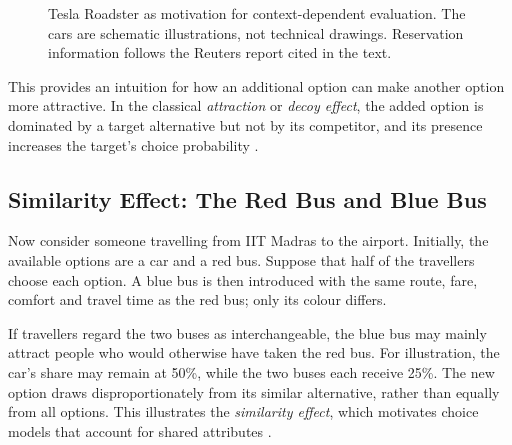 \documentclass[12pt,oneside]{report}
\begin{document}
\begin{figure}[H]
\begin{minipage}{\textwidth}
    \par\vspace{5mm}
    \begingroup
    \setlength{\fboxsep}{8pt}
    \endgroup
    \end{minipage}
    \caption[Tesla Roadster as motivation for context-dependent evaluation]{
    Tesla Roadster as motivation for context-dependent evaluation.
    The cars are schematic illustrations, not technical drawings.
    Reservation information follows the Reuters report cited in the text.
    }
    \label{fig:motivation-tesla-context}
\end{figure}

This provides an intuition for how an additional option can make
another option more attractive. In the classical \emph{attraction}
or \emph{decoy effect}, the added option is dominated by a target
alternative but not by its competitor, and its presence increases
the target's choice probability \citep{huber1982motivation}.

\subsection{Similarity Effect: The Red Bus and Blue Bus}

Now consider someone travelling from IIT Madras to the airport.
Initially, the available options are a car and a red bus. Suppose
that half of the travellers choose each option. A blue bus is then
introduced with the same route, fare, comfort and travel time as
the red bus; only its colour differs.

If travellers regard the two buses as interchangeable, the blue bus
may mainly attract people who would otherwise have taken the red bus.
For illustration, the car's share may remain at 50\%, while the two
buses each receive 25\%. The new option draws disproportionately
from its similar alternative, rather than equally from all options.
This illustrates the \emph{similarity effect}, which motivates
choice models that account for shared attributes \citep{tversky1972motivation}.
\end{document}
